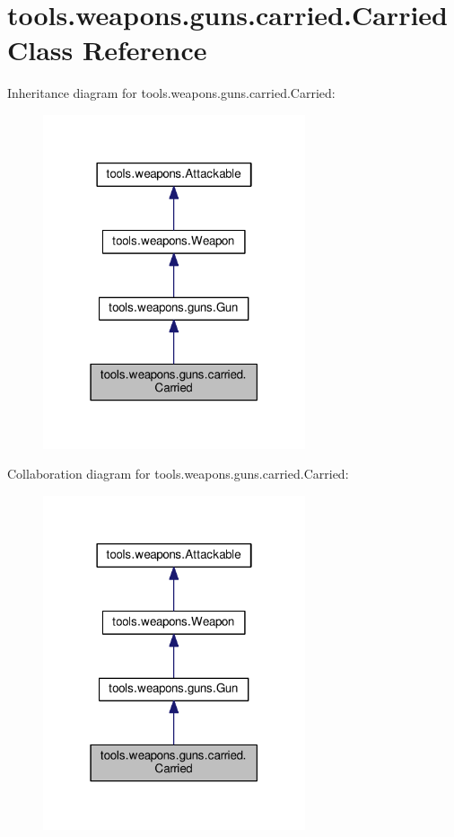 \hypertarget{classtools_1_1weapons_1_1guns_1_1carried_1_1_carried}{}\section{tools.\+weapons.\+guns.\+carried.\+Carried Class Reference}
\label{classtools_1_1weapons_1_1guns_1_1carried_1_1_carried}


Inheritance diagram for tools.\+weapons.\+guns.\+carried.\+Carried\+:\nopagebreak
\begin{figure}[H]
\begin{center}
\leavevmode
\includegraphics[width=219pt]{classtools_1_1weapons_1_1guns_1_1carried_1_1_carried__inherit__graph}
\end{center}
\end{figure}


Collaboration diagram for tools.\+weapons.\+guns.\+carried.\+Carried\+:\nopagebreak
\begin{figure}[H]
\begin{center}
\leavevmode
\includegraphics[width=219pt]{classtools_1_1weapons_1_1guns_1_1carried_1_1_carried__coll__graph}
\end{center}
\end{figure}
